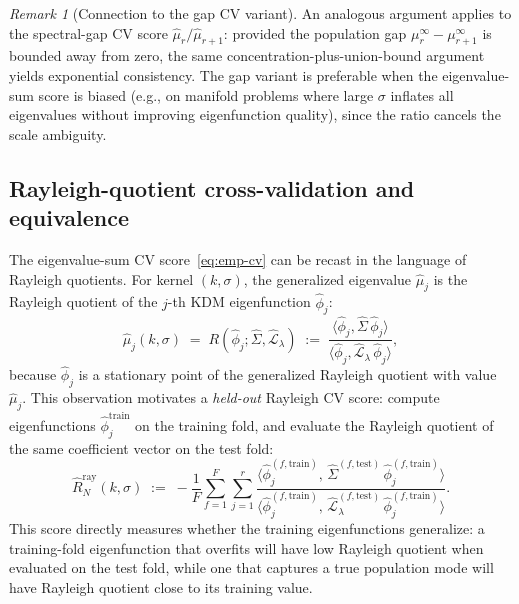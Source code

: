 \documentclass[11pt]{article}
\theoremstyle{remark}
\newtheorem{remark}{Remark}[section]
\begin{document}
\begin{remark}[Connection to the gap CV variant]
\label{rem:gap-cv-preferred}
An analogous argument applies to the spectral-gap CV score $\widehat{\mu}_r/\widehat{\mu}_{r+1}$: provided the population gap $\mu_r^\infty-\mu_{r+1}^\infty$ is bounded away from zero, the same concentration-plus-union-bound argument yields exponential consistency.
The gap variant is preferable when the eigenvalue-sum score is biased (e.g., on manifold problems where large $\sigma$ inflates all eigenvalues without improving eigenfunction quality), since the ratio cancels the scale ambiguity.
\end{remark}

\subsection{Rayleigh-quotient cross-validation and equivalence}
\label{subsec:rayleigh-cv}

The eigenvalue-sum CV score~\eqref{eq:emp-cv} can be recast in the language of Rayleigh quotients.
For kernel $(k,\sigma)$, the generalized eigenvalue $\widehat{\mu}_j$ is the Rayleigh quotient of the $j$-th KDM eigenfunction $\widehat\phi_j$:
\begin{equation}
\label{eq:rayleigh-def}
\widehat{\mu}_j(k,\sigma)
\;=\;
R(\widehat\phi_j; \widehat\Sigma, \widehat{\mathcal{L}}_\lambda)
\;:=\;
\frac{\langle \widehat\phi_j, \widehat\Sigma\, \widehat\phi_j\rangle}
     {\langle \widehat\phi_j, \widehat{\mathcal{L}}_{\lambda}\, \widehat\phi_j\rangle},
\end{equation}
because $\widehat\phi_j$ is a stationary point of the generalized Rayleigh quotient with value $\widehat\mu_j$.
This observation motivates a \emph{held-out} Rayleigh CV score: compute eigenfunctions $\widehat\phi_j^{\mathrm{train}}$ on the training fold, and evaluate the Rayleigh quotient of the same coefficient vector on the test fold:
\begin{equation}
\label{eq:rayleigh-cv}
\widehat{R}^{\mathrm{ray}}_N(k,\sigma)
\;:=\;
-\frac{1}{F}\sum_{f=1}^F \sum_{j=1}^r
\frac{\langle \widehat\phi_j^{(f,\mathrm{train})},\,\widehat\Sigma^{(f,\mathrm{test})}\,\widehat\phi_j^{(f,\mathrm{train})}\rangle}
     {\langle \widehat\phi_j^{(f,\mathrm{train})},\,\widehat{\mathcal{L}}_{\lambda}^{(f,\mathrm{test})}\,\widehat\phi_j^{(f,\mathrm{train})}\rangle}.
\end{equation}
This score directly measures whether the training eigenfunctions generalize: a training-fold eigenfunction that overfits will have low Rayleigh quotient when evaluated on the test fold, while one that captures a true population mode will have Rayleigh quotient close to its training value.
\end{document}
